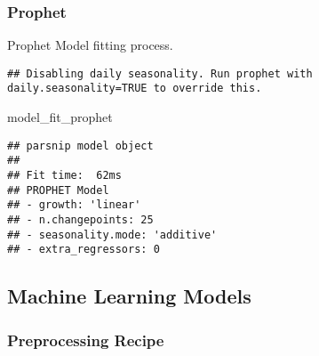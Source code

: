 \documentclass[
]{article}
\newenvironment{Shaded}{\begin{snugshade}}{\end{snugshade}}
\newcommand{\DataTypeTok}[1]{\textcolor[rgb]{0.13,0.29,0.53}{#1}}
\newcommand{\KeywordTok}[1]{\textcolor[rgb]{0.13,0.29,0.53}{\textbf{#1}}}
\newcommand{\NormalTok}[1]{#1}
\newcommand{\OperatorTok}[1]{\textcolor[rgb]{0.81,0.36,0.00}{\textbf{#1}}}
\newcommand{\OtherTok}[1]{\textcolor[rgb]{0.56,0.35,0.01}{#1}}
\newcommand{\StringTok}[1]{\textcolor[rgb]{0.31,0.60,0.02}{#1}}
\begin{document}
\hypertarget{prophet}{%
\subsubsection{Prophet}\label{prophet}}

Prophet Model fitting process.

\begin{Shaded}
\end{Shaded}

\begin{verbatim}
## Disabling daily seasonality. Run prophet with daily.seasonality=TRUE to override this.
\end{verbatim}

\begin{Shaded}
\begin{Highlighting}[]
\NormalTok{model_fit_prophet}
\end{Highlighting}
\end{Shaded}

\begin{verbatim}
## parsnip model object
## 
## Fit time:  62ms 
## PROPHET Model
## - growth: 'linear'
## - n.changepoints: 25
## - seasonality.mode: 'additive'
## - extra_regressors: 0
\end{verbatim}

\hypertarget{machine-learning-models}{%
\subsection{Machine Learning Models}\label{machine-learning-models}}

\hypertarget{preprocessing-recipe}{%
\subsubsection{Preprocessing Recipe}\label{preprocessing-recipe}}
\end{document}
